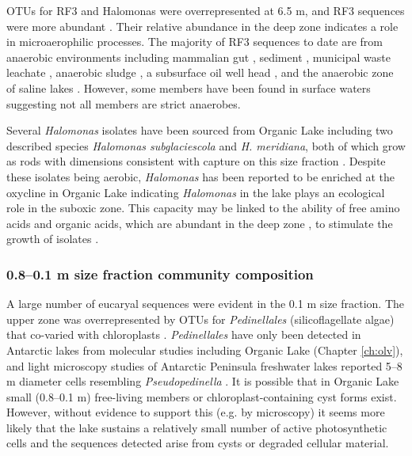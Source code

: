 \acp{OTU} for RF3 and Halomonas were overrepresented at 6.5 m, and RF3 sequences were more abundant . 
Their relative abundance in the deep zone indicates a role in microaerophilic processes. 
The majority of RF3 sequences to date are from anaerobic environments including mammalian gut \cite{Tajima1999, Ley2006, Samsudin2011}, sediment \cite{Yanagibayashi1999, Roske2012}, municipal waste leachate \cite{Huang2005}, anaerobic sludge \cite{Chouari2005, Goberna2009, Riviere2009, Tang2011}, a subsurface oil well head \cite{Yamane2011}, and the anaerobic zone of saline lakes \cite{Humayoun2003, Schmidtova2009, Bowman2000a}. 
However, some members have been found in surface waters \cite{Demergasso2008, Xing2009, Yilmaz2012} suggesting not all members are strict anaerobes. 

Several \emph{Halomonas} isolates have been sourced from Organic Lake including two described species \emph{Halomonas subglaciescola} and \emph{H. meridiana}, both of which grow as rods with dimensions consistent with capture on this size fraction \cite{Franzmann1987a, James1990}. 
Despite these isolates being aerobic, \emph{Halomonas} has been reported to be enriched at the oxycline in Organic Lake \cite{James1994} indicating \emph{Halomonas} in the lake plays an ecological role in the suboxic zone. 
This capacity may be linked to the ability of free amino acids and organic acids, which are abundant in the deep zone \cite{Gibson1994}, to stimulate the growth of isolates \cite{Franzmann1987a}.

\subsubsection{0.8--0.1 \textmu{}m size fraction community composition}
\label{subsubs:0.8--0.1}
A large number of eucaryal sequences were evident in the 0.1 \textmu{}m size fraction. 
The upper zone was overrepresented by \acp{OTU} for \emph{Pedinellales} (silicoflagellate algae) that co-varied with chloroplasts . 
\emph{Pedinellales} have only been detected in Antarctic lakes from molecular studies \cite{Unrein2005, Lauro2011} including Organic Lake \cite{Yau2011} (Chapter \ref{ch:olv}), and light microscopy studies of Antarctic Peninsula freshwater lakes reported 5--8 \textmu{}m diameter cells resembling \emph{Pseudopedinella} \cite{Unrein2005}. 
It is possible that in Organic Lake small (0.8–0.1 \textmu{}m) free-living members or chloroplast-containing cyst forms \cite{Thomsen1988} exist. 
However, without evidence to support this (e.g. by microscopy) it seems more likely that the lake sustains a relatively small number of active photosynthetic cells and the sequences detected arise from cysts or degraded cellular material.

